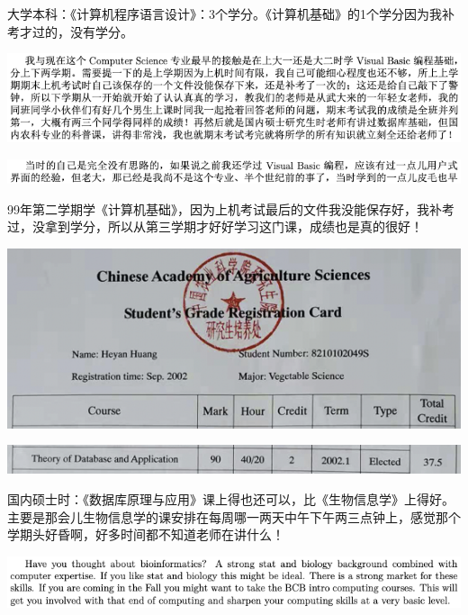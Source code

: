 \documentclass[9pt, b5paper]{article}
\begin{document}
大学本科：《计算机程序语言设计》：3个学分。《计算机基础》的1个学分因为我补考才过的，没有学分。

\begin{center}
\includegraphics[width=.9\linewidth]{./pic/backups_plans_20210421_134744.png}
\end{center}

\begin{center}
\includegraphics[width=.9\linewidth]{./pic/backups_plans_20210421_134614.png}
\end{center}

99年第二学期学《计算机基础》，因为上机考试最后的文件我没能保存好，我补考过，没拿到学分，所以从第三学期才好好学习这门课，成绩也是真的很好！

\begin{center}
\includegraphics[width=.9\linewidth]{./pic/backups_plans_20210419_094833.png}
\end{center}

\begin{center}
\includegraphics[width=.9\linewidth]{./pic/backups_plans_20210421_135421.png}
\end{center}

国内硕士时：《数据库原理与应用》课上得也还可以，比《生物信息学》上得好。主要是那会儿生物信息学的课安排在每周哪一两天中午下午两三点钟上，感觉那个学期头好昏啊，好多时间都不知道老师在讲什么！

\begin{center}
\includegraphics[width=.9\linewidth]{./pic/backups_plans_20210421_090620.png}
\end{center}
\end{document}

